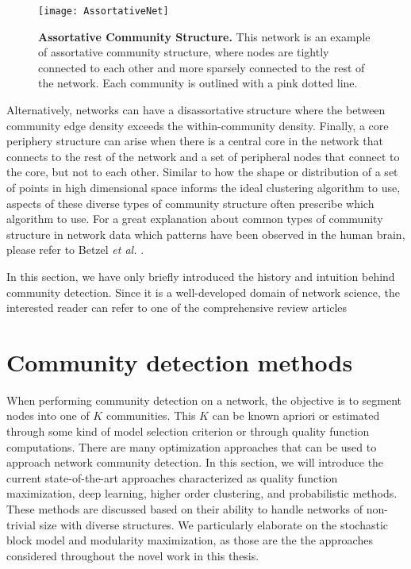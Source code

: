  \begin{figure}
\begin{center}
\texttt{[image: AssortativeNet]}
\caption{{\bf Assortative Community Structure.} This network is an example of assortative community structure, where nodes are tightly connected to each other and more sparsely connected to the rest of the network. Each community is outlined with a pink dotted line.}
\label{fig:Assort}
\end{center}
\end{figure}

Alternatively, networks can have a disassortative structure where the between community edge density exceeds the within-community density. Finally, a core periphery structure can arise when there is a central core in the network that connects to the rest of the network and a set of peripheral nodes that connect to the core, but not to each other.  Similar to how the shape or distribution of a set of points in high dimensional space informs the ideal clustering algorithm to use, aspects of these diverse types of community structure often prescribe which algorithm to use. For a great explanation about common types of community structure in network data which patterns have been observed in the human brain, please refer to Betzel \emph{et al.} \cite{betzel}.  

In this section, we have only briefly introduced the history and intuition behind community detection. Since it is a well-developed domain of network science, the interested reader can refer to one of the comprehensive review articles \cite{fortu1,fortu2,shaicase,muchacommunity}

\section{Community detection methods}
When performing community detection on a network, the objective is to segment nodes into one of $K$ communities. This $K$ can be known apriori or estimated through some kind of model selection criterion or through quality function computations. There are many optimization approaches that can be used to approach network community detection. In this section, we will introduce the current state-of-the-art approaches characterized as quality function maximization, deep learning, higher order clustering, and probabilistic methods. These methods are discussed based on their ability to handle networks of non-trivial size with diverse structures. We particularly elaborate on the stochastic block model and modularity maximization, as those are the the approaches considered throughout the novel work in this thesis.  

